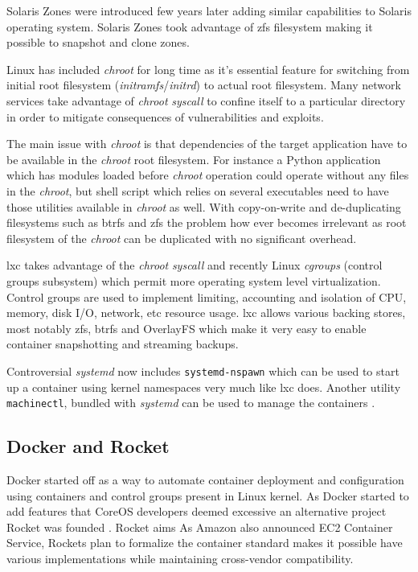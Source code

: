 \documentclass[a4paper,11pt]{kth-mag}
\begin{document}
Solaris Zones were introduced few years later adding similar
capabilities to Solaris operating system.
Solaris Zones took advantage of \acrshort{zfs} filesystem making it
possible to snapshot and clone zones.

Linux has included \emph{chroot} for long time as it's
essential feature for switching from initial root
filesystem (\emph{initramfs}/\emph{initrd}) to actual root filesystem.
Many network services take advantage of \emph{chroot} \emph{syscall} to confine
itself to a particular directory in order to mitigate consequences
of vulnerabilities and exploits.

The main issue with \emph{chroot} is that dependencies of the target
application have to be available in the \emph{chroot} root filesystem.
For instance a Python application which has modules loaded before
\emph{chroot} operation could operate without any files in the \emph{chroot},
but shell script which relies on several executables need to have
those utilities available in \emph{chroot} as well.
With copy-on-write and de-duplicating filesystems such as
\acrshort{btrfs} and
\acrshort{zfs} the problem how ever becomes irrelevant as root
filesystem of the \emph{chroot} can be duplicated with no significant overhead.



\acrfull{lxc}
\cite{lxc}
takes advantage of the \emph{chroot} \emph{syscall} and
recently Linux \emph{cgroups} (control groups subsystem) which permit
more  operating system level virtualization.
Control groups are used to implement limiting, accounting
and isolation of CPU, memory, disk I/O, network, etc resource usage.
\acrshort{lxc} allows various backing stores, most notably \acrshort{zfs}, \acrshort{btrfs} and
OverlayFS which make it very easy to enable container
snapshotting and streaming backups.

Controversial \emph{systemd} now includes \lstinline!systemd-nspawn!
which can be used to start up a container using kernel namespaces
very much like \acrshort{lxc} does.
Another utility \lstinline!machinectl!, bundled with \emph{systemd}
can be used to manage the containers
\cite{systemd-nspawn}.

\subsection{Docker and Rocket}

Docker started off as a way to automate container deployment and
configuration using containers and control groups present in Linux
kernel. As Docker started to add features that CoreOS developers
deemed excessive an alternative project Rocket was founded
\cite{rocket}.
Rocket aims
As Amazon also announced EC2 Container Service,
Rockets plan to formalize the container standard
makes it possible have various implementations while
maintaining cross-vendor compatibility.
\end{document}
